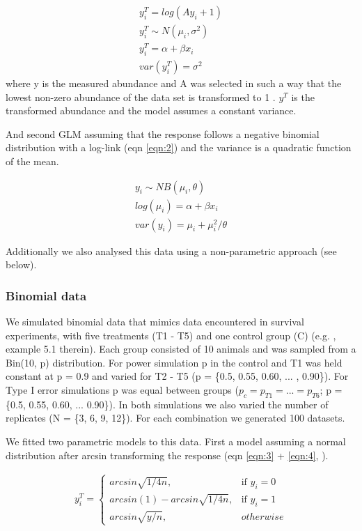 \documentclass{scrartcl}\usepackage[]{graphicx}\usepackage[]{color}
\begin{document}
\begin{align}
  y^T_i = log(Ay_i + 1) \\
  y^T_i \sim N(\mu_i, \sigma^2) \nonumber \\
  y^T_i = \alpha + \beta x_i \label{eqn:1} \\
  var(y^T_i) = \sigma^2 \nonumber
\end{align}
where y is the measured abundance and A was selected in such a way that the lowest non-zero abundance of the data set is transformed to 1 \citep{van_den_brink_impact_2000}. 
$y^T$ is the transformed abundance and the model assumes a constant variance.

And second GLM assuming that the response follows a negative binomial distribution with a log-link (eqn \ref{eqn:2}) and
the variance is a quadratic function of the mean.

\begin{align}
  y_i \sim NB(\mu_i, \theta)  \nonumber \\
  log(\mu_i) = \alpha + \beta x_i   \label{eqn:2} \\
  var(y_i) = \mu_i + \mu_i^2 / \theta  \nonumber
\end{align}

Additionally we also analysed this data using a non-parametric approach (see below).

\subsubsection{Binomial data}
We simulated binomial data that mimics data encountered in survival experiments, with five treatments (T1 - T5) and one control group (C) (e.g. \citep{newman_quantitative_2012}, example 5.1 therein).
Each group consisted of 10 animals and was sampled from a Bin(10, p) distribution.
For power simulation p in the control and T1 was held constant at p = 0.9 and varied for T2 - T5  (p = \{0.5, 0.55, 0.60, ... , 0.90\}).
For Type I error simulations p was equal between groups ($p_c = p_{T1} = ... = p_{T6}$; p = \{0.5, 0.55, 0.60, ... 0.90\}).
In both simulations we also varied the number of replicates (N = \{3, 6, 9, 12\}).
For each combination we generated 100 datasets.

We fitted two parametric models to this data.
First a model assuming a normal distribution after arcsin transforming the response (eqn \ref{eqn:3} + \ref{eqn:4}, \citep{epa_methods_2002}).

\begin{align}
  y^T_i = 
  \begin{cases}
    arcsin \sqrt{1/4n}, & \text{if } y_i = 0 \\
    arcsin(1) - arcsin \sqrt{1/4n}, & \text{if } y_i = 1 \\
    arcsin \sqrt{y / n}, & otherwise
  \end{cases}
  \label{eqn:3}
\end{align}
\end{document}
